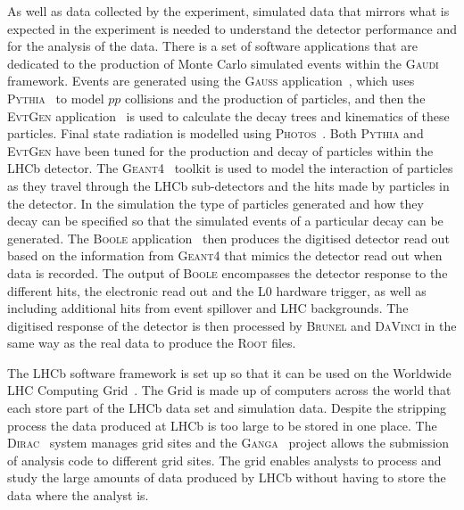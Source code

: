 As well as data collected by the experiment, simulated data that mirrors what is expected in the experiment is needed to understand the detector performance and for the analysis of the data. There is a set of software applications that are dedicated to the production of Monte Carlo simulated events within the \textsc{Gaudi} framework. Events are generated using the \textsc{Gauss} application~\cite{1742-6596-331-3-032047, Clemencic:2011zza}, which uses \textsc{Pythia}~\cite{Sjostrand:2006za,Sjostrand:2007gs} to model $pp$ collisions and the production of particles, and then the \textsc{Evt}\textsc{Gen} application~\cite{Lange:2001uf} is used to calculate the decay trees and kinematics of these particles. Final state radiation is modelled using \textsc{Photos}~\cite{Golonka:2005pn}. Both \textsc{Pythia} and \textsc{Evt}\textsc{Gen} have been tuned for the production and decay of particles within the LHCb detector. The \textsc{Geant4}~\cite{Agostinelli:2002hh,Allison:2006ve} toolkit is used to model the interaction of particles as they travel through the LHCb sub-detectors and the hits made by particles in the detector. In the simulation the type of particles generated and how they decay can be specified so that the simulated events of a particular decay can be generated. The \textsc{Boole} application~\cite{boole} then produces the digitised detector read out based on the information from \textsc{Geant4} that mimics the detector read out when data is recorded. The output of \textsc{Boole} encompasses the detector response to the different hits, the electronic read out and the L0 hardware trigger, as well as including additional hits from event spillover and LHC backgrounds. The digitised response of the detector is then processed by \textsc{Brunel} and \textsc{DaVinci} in the same way as the real data to produce the \textsc{Root} files. %

The LHCb software framework is set up so that it can be used on the Worldwide LHC Computing Grid~\cite{Bird:2011zz, WWCG}. The Grid is made up of computers across the world that each store part of the LHCb data set and simulation data. Despite the stripping process the data produced at LHCb is too large to be stored in one place. The \textsc{Dirac}~\cite{Paterson:1397926} system manages grid sites and the \textsc{Ganga}~\cite{Ganga, Ganga2} project allows the submission of analysis code to different grid sites. The grid enables analysts to process and study the large amounts of data produced by LHCb without having to store the data where the analyst is. 





